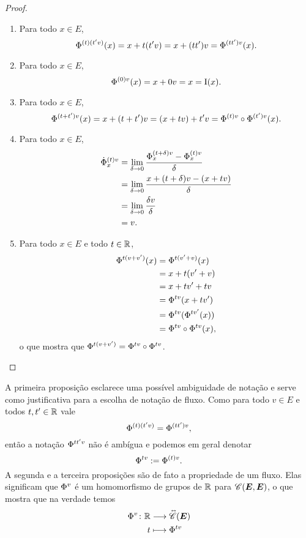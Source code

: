 \begin{proof}
	\begin{enumerate}
	\item Para todo $x \in E$,
		\begin{equation*}
		\flux{(t)}{(t'v)}(x) = x + t(t'v) = x + (tt')v = \flux{(tt')}{v}(x).
		\end{equation*}

	\item Para todo $x \in E$,
		\begin{equation*}
		\flux{(0)}{v}(x) = x + 0v = x = \Id(x).
		\end{equation*}

	\item Para todo $x \in E$,
		\begin{equation*}
		\flux{(t+t')}{v}(x) = x + (t + t')v = (x + tv) + t'v = \flux{(t)}{v} \circ \flux{(t')}{v}(x).
		\end{equation*}

	\item Para todo $x \in E$,
		\begin{align*}
		\flux[\dot]{(t)}{v}_{x} &= \lim_{\delta \to 0} \frac{\flux{(t+\delta)}{v}_{x} - \flux{(t)}{v}_{x}}{\delta} \\
			&= \lim_{\delta \to 0} \frac{x + (t + \delta)v - (x + tv)}{\delta} \\
			&= \lim_{\delta \to 0} \frac{\delta v}{\delta} \\
			&= v.
		\end{align*}

	\item Para todo $x \in E$ e todo $t \in \R$,
		\begin{align*}
		\flux{t}{(v+v')}(x) &= \flux{t}{(v'+v)}(x) \\
			&= x + t(v'+v) \\
			&= x + tv' + tv \\
			&= \flux{t}{v}(x+tv') \\
			&= \flux{t}{v}(\flux{t}{v'}(x)) \\
			&= \flux{t}{v} \circ \flux{t}{v} (x),
		\end{align*}
	o que mostra que $\flux{t}{(v+v')} = \flux{t}{v} \circ \flux{t}{v}$.
	\qedhere
	\end{enumerate}
\end{proof}

A primeira proposição esclarece uma possível ambiguidade de notação e serve como justificativa para a escolha de notação de fluxo. Como para todo $v \in E$ e todos $t,t' \in \R$ vale
	\begin{equation*}
	\flux{(t)}{(t'v)} = \flux{(tt')}{v},
	\end{equation*}
então a notação $\flux{tt'}{v}$ não é ambígua e podemos em geral denotar
	\begin{equation*}
	\flux{t}{v} := \flux{(t)}{v}.
	\end{equation*}
A segunda e a terceira proposições são de fato a propriedade de um fluxo. Elas significam que $\flux{}{v}$ é um homomorfismo de grupos de $\R$ para $\Cont(\bm E, \bm E)$, o que mostra que na verdade temos
	\begin{align*}
	\func{\flux{}{v}}{\R}{\Homeo(\bm E)}{t}{\flux{t}{v}}
	\end{align*}

